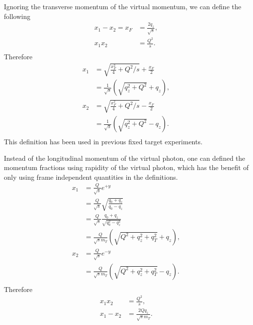 \documentclass[../main.tex]{subfiles}
\begin{document}
Ignoring the transverse momentum of the virtual momentum, we can define the following
\begin{equation}
    \begin{split}
        x_1-x_2=x_F &= \frac{2q_z}{\sqrt{s}},\\
        x_1x_2 &= \frac{Q^2}{s}.\\
    \end{split}
\end{equation}
Therefore
\begin{equation}
    \begin{split}
        x_1 &= \sqrt{\frac{x_F^2}{4}+Q^2/s}+\frac{x_F}{2} \\
            &=\frac{1}{\sqrt{s}}\left(\sqrt{q_z^2+Q^2}+q_z \right),\\
        x_2 &= \sqrt{\frac{x_F^2}{4}+Q^2/s}-\frac{x_F}{2} \\
            &=\frac{1}{\sqrt{s}}\left(\sqrt{q_z^2+Q^2}-q_z \right).\\
    \end{split}
\end{equation}
This definition has been used in previous fixed target experiments.


Instead of the longitudinal momentum of the virtual photon, one can defined
the momentum fractions using rapidity of the virtual photon, which has the benefit
of only using frame independent quantities in the definitions.
\begin{equation}
    \begin{split}
        x_1 &= \frac{Q}{\sqrt{s}} e^{+y}\\
            &= \frac{Q}{\sqrt{s}} \sqrt{ \frac{q_0+q_z}{q_0-q_z} }\\
            &= \frac{Q}{\sqrt{s}} \frac{q_0+q_z}{\sqrt{q_0^2-q_z^2}}\\
            &=\frac{Q}{\sqrt{s}m_T}\left(\sqrt{Q^2+q_z^2+q_T^2}+q_z\right),\\
        x_2 &= \frac{Q}{\sqrt{s}} e^{-y}\\
            &= \frac{Q}{\sqrt{s}m_T}\left(\sqrt{Q^2+q_z^2+q_T^2}-q_z\right).\\
    \end{split}
\end{equation}
Therefore
\begin{equation}
    \begin{split}
        x_1x_2 &= \frac{Q^2}{s},\\
        x_1-x_2 &= \frac{2Qq_z}{\sqrt{s}m_T}.
    \end{split}
\end{equation}
\end{document}
